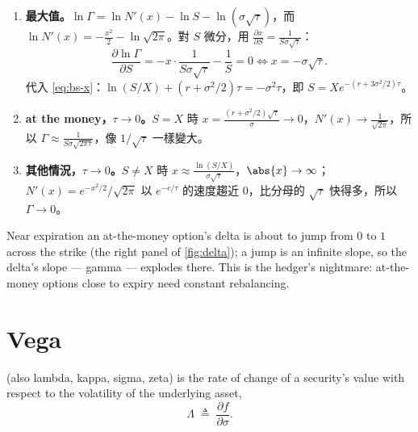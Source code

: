 \begin{remark}[補充]
	\begin{enumerate}[(1),nosep]
		\item \textbf{最大值。}$\ln\Gamma=\ln N'(x)-\ln S-\ln(\sigma\sqrt{\tau})$，而 $\ln N'(x)=-\frac{x^{2}}{2}-\ln\sqrt{2\pi}$。對 $S$ 微分，用 $\frac{\partial x}{\partial S}=\frac{1}{S\sigma\sqrt{\tau}}$：
		\[
			\frac{\partial\ln\Gamma}{\partial S}=-x\cdot\frac{1}{S\sigma\sqrt{\tau}}-\frac1S=0\iff x=-\sigma\sqrt{\tau} .
		\]
		代入 \eqref{eq:bs-x}：$\ln(S/X)+(r+\sigma^{2}/2)\tau=-\sigma^{2}\tau$，即 $S=Xe^{-(r+3\sigma^{2}/2)\tau}$。
		\item \textbf{at the money，$\tau\to0$。}$S=X$ 時 $x=\frac{(r+\sigma^{2}/2)\sqrt{\tau}}{\sigma}\to0$，$N'(x)\to\frac{1}{\sqrt{2\pi}}$，所以 $\Gamma\approx\frac{1}{S\sigma\sqrt{2\pi\tau}}$，像 $1/\sqrt{\tau}$ 一樣變大。
		\item \textbf{其他情況，$\tau\to0$。}$S\ne X$ 時 $x\approx\frac{\ln(S/X)}{\sigma\sqrt{\tau}}$，$\abs{x}\to\infty$；$N'(x)=e^{-x^{2}/2}/\sqrt{2\pi}$ 以 $e^{-c/\tau}$ 的速度趨近 $0$，比分母的 $\sqrt{\tau}$ 快得多，所以 $\Gamma\to0$。
	\end{enumerate}
\end{remark}

\begin{intuition}
	Near expiration an at-the-money option's delta is about to jump from $0$ to $1$ across the strike (the right panel of \autoref{fig:delta}); a jump is an infinite slope, so the delta's slope --- gamma --- explodes there.
	This is the hedger's nightmare: at-the-money options close to expiry need constant rebalancing.
\end{intuition}

\suppend

\section{Vega}
\label{sec:vega}


\begin{definition}
	 (also lambda, kappa, sigma, zeta) is the rate of change of a security's value with respect to the volatility of the underlying asset,
	\[
		\Lambda \;\triangleq\; \frac{\partial f}{\partial\sigma} .
	\]
\end{definition}

